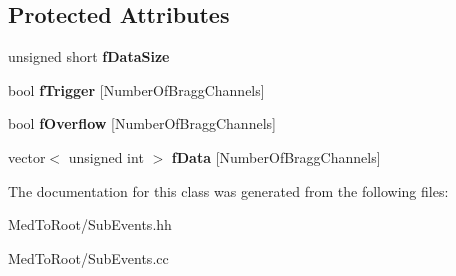\subsection*{Protected Attributes}
\begin{DoxyCompactItemize}
\item 
\mbox{\label{class_bragg_chamber_sub_event_aa5205f96a716ea517af677c074367d9a}} 
unsigned short {\bfseries f\+Data\+Size}
\item 
\mbox{\label{class_bragg_chamber_sub_event_ac33e87b9327b80f85032de6076f1986e}} 
bool {\bfseries f\+Trigger} \mbox{[}Number\+Of\+Bragg\+Channels\mbox{]}
\item 
\mbox{\label{class_bragg_chamber_sub_event_a59f31e1a784e52768d19bfd98dae16f0}} 
bool {\bfseries f\+Overflow} \mbox{[}Number\+Of\+Bragg\+Channels\mbox{]}
\item 
\mbox{\label{class_bragg_chamber_sub_event_a12a0e9050a32c41872751696a6c4606e}} 
vector$<$ unsigned int $>$ {\bfseries f\+Data} \mbox{[}Number\+Of\+Bragg\+Channels\mbox{]}
\end{DoxyCompactItemize}


The documentation for this class was generated from the following files\+:\begin{DoxyCompactItemize}
\item 
Med\+To\+Root/Sub\+Events.\+hh\item 
Med\+To\+Root/Sub\+Events.\+cc\end{DoxyCompactItemize}
